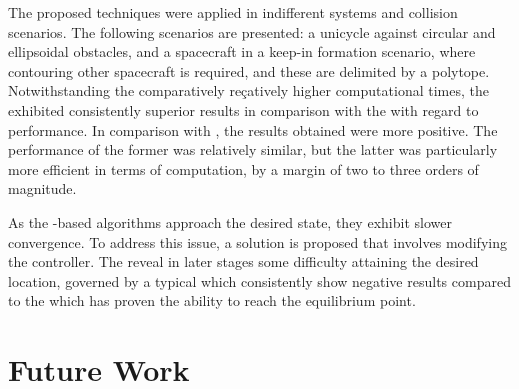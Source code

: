 The proposed techniques were applied in indifferent systems and collision scenarios. The following scenarios are presented: a unicycle against circular and ellipsoidal obstacles, and a spacecraft in a keep-in formation scenario, where contouring other spacecraft is required, and these are delimited by a polytope.  Notwithstanding the comparatively reçatively higher computational times, the   exhibited consistently superior results in comparison with the  with regard to performance. In comparison with , the results obtained were more positive. The performance of the former was relatively similar, but the latter was particularly more efficient in terms of computation, by a margin of two to three orders of magnitude. 

As the -based algorithms approach the desired state, they exhibit slower convergence. To address this issue, a solution is proposed that involves modifying the controller. The  reveal in later stages some difficulty attaining the desired location, governed by a typical  which consistently show negative results compared to the  which has proven the ability to reach the equilibrium point.


\section{Future Work}
\label{sec:future_work}

